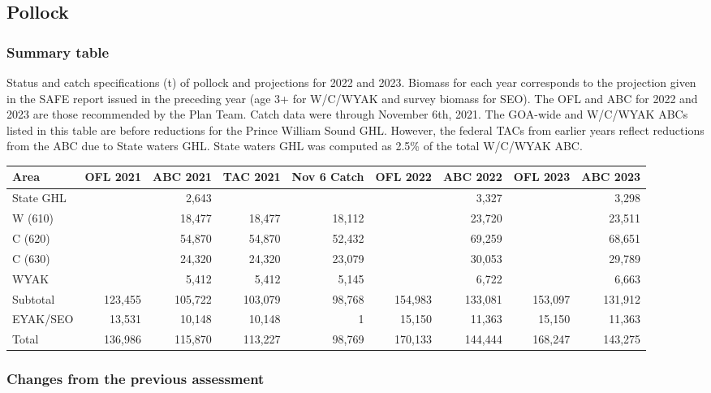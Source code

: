 \documentclass[]{tufte-handout}
\begin{document}
\hypertarget{pollock}{%
\subsection{Pollock}\label{pollock}}

\hypertarget{summary-table}{%
\subsubsection{Summary table}\label{summary-table}}

Status and catch specifications (t) of pollock and projections for 2022
and 2023. Biomass for each year corresponds to the projection given in
the SAFE report issued in the preceding year (age 3+ for W/C/WYAK and
survey biomass for SEO). The OFL and ABC for 2022 and 2023 are those
recommended by the Plan Team. Catch data were through November 6th,
2021. The GOA-wide and W/C/WYAK ABCs listed in this table are before
reductions for the Prince William Sound GHL. However, the federal TACs
from earlier years reflect reductions from the ABC due to State waters
GHL. State waters GHL was computed as 2.5\% of the total W/C/WYAK ABC.

\begin{table}
\centering
\begin{tabular}[t]{l|r|r|r|r|r|r|r|r}
\hline
Area & OFL 2021 & ABC 2021 & TAC 2021 & Nov 6 Catch & OFL 2022 & ABC 2022 & OFL 2023 & ABC 2023\\
\hline
State GHL &  & 2,643 &  &  &  & 3,327 &  & 3,298\\
\hline
W (610) &  & 18,477 & 18,477 & 18,112 &  & 23,720 &  & 23,511\\
\hline
C (620) &  & 54,870 & 54,870 & 52,432 &  & 69,259 &  & 68,651\\
\hline
C (630) &  & 24,320 & 24,320 & 23,079 &  & 30,053 &  & 29,789\\
\hline
WYAK &  & 5,412 & 5,412 & 5,145 &  & 6,722 &  & 6,663\\
\hline
Subtotal & 123,455 & 105,722 & 103,079 & 98,768 & 154,983 & 133,081 & 153,097 & 131,912\\
\hline
EYAK/SEO & 13,531 & 10,148 & 10,148 & 1 & 15,150 & 11,363 & 15,150 & 11,363\\
\hline
Total & 136,986 & 115,870 & 113,227 & 98,769 & 170,133 & 144,444 & 168,247 & 143,275\\
\hline
\end{tabular}
\end{table}

\hypertarget{changes-from-the-previous-assessment}{%
\subsubsection{Changes from the previous
assessment}\label{changes-from-the-previous-assessment}}
\end{document}
